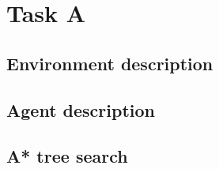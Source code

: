 
\chapter{Task A}
\section{Environment description}

\section{Agent description}

\section{A* tree search}


